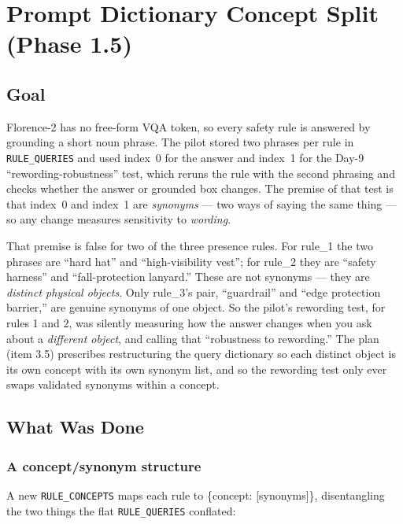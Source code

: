 \chapter{Prompt Dictionary Concept Split (Phase 1.5)}
\label{chap:p1-5}

\section{Goal}

Florence-2 has no free-form VQA token, so every safety rule is answered by grounding a short noun
phrase. The pilot stored two phrases per rule in \texttt{RULE\_QUERIES} and used index~0 for the
answer and index~1 for the Day-9 ``rewording-robustness'' test, which reruns the rule with the second
phrasing and checks whether the answer or grounded box changes. The premise of that test is that
index~0 and index~1 are \emph{synonyms} --- two ways of saying the same thing --- so any change
measures sensitivity to \emph{wording}.

That premise is false for two of the three presence rules. For rule\_1 the two phrases are ``hard
hat'' and ``high-visibility vest''; for rule\_2 they are ``safety harness'' and ``fall-protection
lanyard.'' These are not synonyms --- they are \emph{distinct physical objects}. Only rule\_3's pair,
``guardrail'' and ``edge protection barrier,'' are genuine synonyms of one object. So the pilot's
rewording test, for rules 1 and 2, was silently measuring how the answer changes when you ask about a
\emph{different object}, and calling that ``robustness to rewording.'' The plan (item 3.5) prescribes
restructuring the query dictionary so each distinct object is its own concept with its own synonym
list, and so the rewording test only ever swaps validated synonyms within a concept.

\section{What Was Done}

\subsection{A concept/synonym structure}

A new \texttt{RULE\_CONCEPTS} maps each rule to \{concept: [synonyms]\}, disentangling the two things
the flat \texttt{RULE\_QUERIES} conflated:

